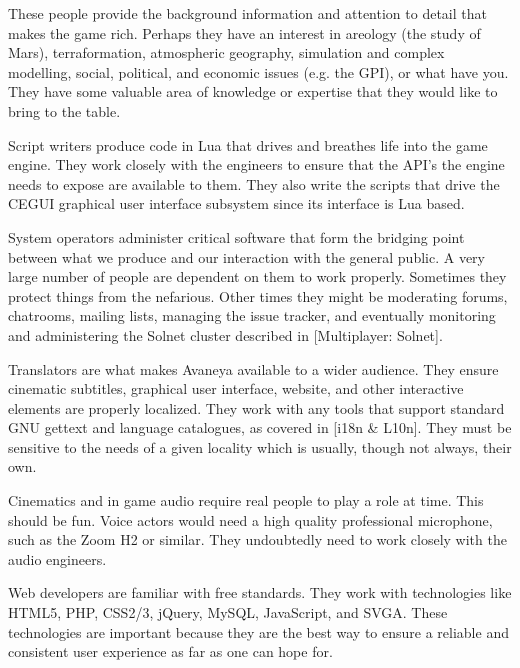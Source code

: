 
These people provide the background information and attention to detail that makes the game rich. Perhaps they have an interest in areology (the study of Mars), terraformation, atmospheric geography, simulation and complex modelling, social, political, and economic issues (e.g. the GPI), or what have you. They have some valuable area of knowledge or expertise that they would like to bring to the table.


Script writers produce code in Lua that drives and breathes life into the game engine. They work closely with the engineers to ensure that the API's the engine needs to expose are available to them. They also write the scripts that drive the CEGUI graphical user interface subsystem since its interface is Lua based.


System operators administer critical software that form the bridging point between what we produce and our interaction with the general public. A very large number of people are dependent on them to work properly. Sometimes they protect things from the nefarious. Other times they might be moderating forums, chatrooms, mailing lists, managing the issue tracker, and eventually monitoring and administering the Solnet cluster described in [Multiplayer: Solnet].


Translators are what makes Avaneya available to a wider audience. They ensure cinematic subtitles, graphical user interface, website, and other interactive elements are properly localized. They work with any tools that support standard GNU gettext and language catalogues, as covered in [i18n & L10n]. They must be sensitive to the needs of a given locality which is usually, though not always, their own.


Cinematics and in game audio require real people to play a role at time. This should be fun. Voice actors would need a high quality professional microphone, such as the Zoom H2 or similar. They undoubtedly need to work closely with the audio engineers.


Web developers are familiar with free standards. They work with technologies like HTML5, PHP, CSS2/3, jQuery, MySQL, JavaScript, and SVGA. These technologies are important because they are the best way to ensure a reliable and consistent user experience as far as one can hope for.

